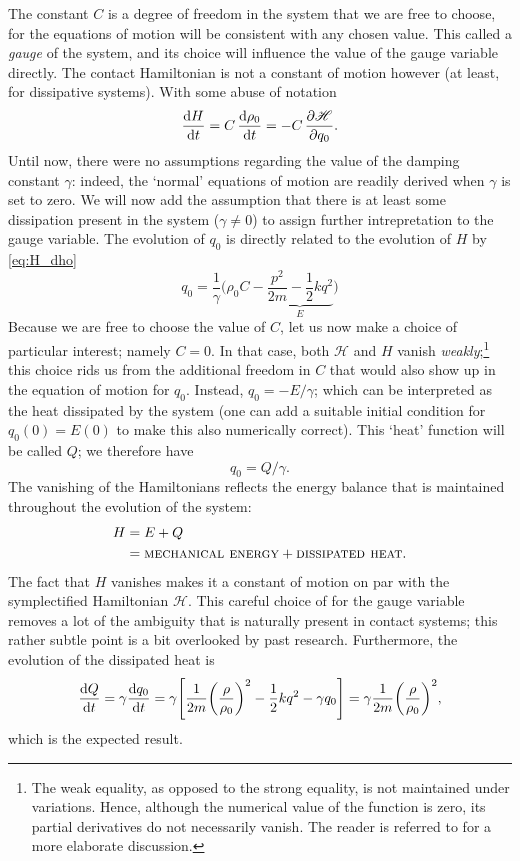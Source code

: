 The constant $C$ is a degree of freedom in the system that we are free to choose, for the equations of motion will be consistent with any chosen value. This called a \emph{gauge} of the system, and its choice will influence the value of the gauge variable directly. The contact Hamiltonian is not a constant of motion however (at least, for dissipative systems). With some abuse of notation
$$ \dv{H}{t} = C\,\dv{\rho_0}{t}  = -C\,\pdv{\mathscr{H}}{q_0}.$$
Until now, there were no assumptions regarding the value of the damping constant $\gamma$: indeed, the `normal' equations of motion are readily derived when $\gamma$ is set to zero. We will now add the assumption that there is at least some dissipation present in the system ($\gamma \neq 0$) to assign further intrepretation to the gauge variable. The evolution of $q_0$ is directly related to the evolution of $H$ by \cref{eq:H_dho}
$$ 
    q_0 = \frac{1}{\gamma} \bigg(\rho_0 C - \underbrace{\frac{p^2}{2m} - \frac{1}{2}kq^2}_{E}\bigg)
$$
Because we are free to choose the value of $C$, let us now make a choice of particular interest; namely $C = 0$. In that case, both $\mathscr{H}$ and $H$ vanish \emph{weakly};\footnote
{The weak equality, as opposed to the strong equality, is not maintained under variations. Hence, although the numerical value of the function is zero, its partial derivatives do not necessarily vanish. The reader is referred to \citet{Dirac1950} for a more elaborate discussion.}
this choice rids us from the additional freedom in $C$ that would also show up in the equation of motion for $q_0$. Instead, $q_0 = - E/\gamma$; which can be interpreted as the heat dissipated by the system (one can add a suitable initial condition for $q_0(0) = E(0)$ to make this also numerically correct). This `heat' function will be called $Q$; we therefore have
$$ q_0 = Q/\gamma. $$
The vanishing of the Hamiltonians reflects the energy balance that is maintained throughout the evolution of the system:
\begin{equation*}
    \begin{split}
        H &= E + Q \\
          &= \text{\textsc{mechanical energy}} + \text{\textsc{dissipated heat}}.
    \end{split}
\end{equation*}
The fact that $H$ vanishes makes it a constant of motion on par with the symplectified Hamiltonian $\mathscr{H}$. This careful choice of for the gauge variable removes a lot of the ambiguity that is naturally present in contact systems; this rather subtle point is a bit overlooked by past research. \cite{Bravetti2017} 
Furthermore, the evolution of the dissipated heat is
$$ \dv{Q}{t} = \gamma \dv{q_0}{t} = \gamma \qty[\frac{1}{2m}\qty(\frac{\rho}{\rho_0})^2 - \frac{1}{2}kq^2 - \gamma q_0] = \gamma\frac{1}{2m}\qty(\frac{\rho}{\rho_0})^2, $$
which is the expected result.

